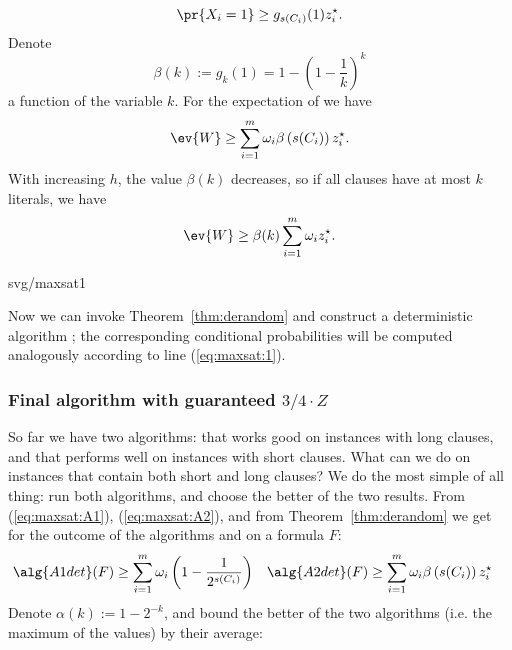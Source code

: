 \noindent
\begin{minipage}[t]{0.5\textwidth}
$$\pr{X_i=1}\ge g_{s(C_i)}(1)z_i^\star.$$
Denote 
$$\beta(k):=g_k(1)=1-\left(1-\frac{1}{k}\right)^k$$ a function of the variable  $k$.
For the expectation of  we have
\begin{equation}
\label{eq:maxsat:A2}
\ev{W}\ge\sum_{i=1}^m\omega_i\beta\left(s(C_i)\right)z_i^\star.
\end{equation}
With increasing $h$, the value $\beta(k)$
decreases, so if all clauses have at most $k$ literals, we have
$$\ev{W}\ge\beta(k)\sum_{i=1}^m\omega_iz_i^\star.$$
\end{minipage}\hspace*{0.05\textwidth}\begin{minipage}[t]{0.45\textwidth}
\begin{myfig}{\textwidth}{svg/maxsat1}
\end{myfig}
\end{minipage}

\vspace*{-3ex}
\noindent
Now we can invoke Theorem~\ref{thm:derandom} 
and construct a deterministic algorithm ;
the corresponding conditional probabilities will be computed analogously according to line
(\ref{eq:maxsat:1}).

\subsubsection*{Final algorithm with guaranteed $3/4\cdot Z$ }

\noindent
So far we have two algorithms:  that works good on instances with long clauses, and
 that performs well on instances with short clauses. What can we do on instances that contain both
short and long clauses? We do the most simple of all thing: run both algorithms, and choose the better 
of the two results. From 
 (\ref{eq:maxsat:A1}), (\ref{eq:maxsat:A2}), and from Theorem~\ref{thm:derandom} 
we get for the outcome of the algorithms  
 and  on a formula $F$:
\begin{align*}
  \alg{A1det}(F) & \ge \sum_{i=1}^m\omega_i\left(1-\frac{1}{2^{s(C_i)}}\right) &
\alg{A2det}(F) & \ge \sum_{i=1}^m\omega_i\beta\left(s(C_i)\right)z_i^\star
\end{align*}
Denote $\alpha(k):=1-2^{-k}$, and bound 
the better of the two algorithms (i.e. the maximum of the values) by their average:

